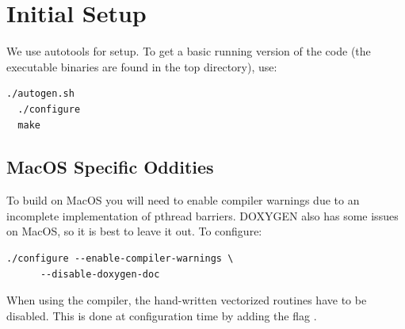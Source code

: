 \section{Initial Setup}

We use autotools for setup. To get a basic running version of the code (the
executable binaries are found in the top directory), use:

\begin{lstlisting}[style=codeblock]
  ./autogen.sh
  ./configure
  make
\end{lstlisting}


\subsection{MacOS Specific Oddities}

To build on MacOS you will need to enable compiler warnings due to an
incomplete implementation of pthread barriers. DOXYGEN also has some issues on
MacOS, so it is best to leave it out. To configure:

\begin{lstlisting}[style=codeblock]
  ./configure --enable-compiler-warnings \
      --disable-doxygen-doc
\end{lstlisting}

When using the  compiler, the hand-written vectorized
routines have to be disabled. This is done at configuration time by adding the
flag \inlinecode{-{}-disable-hand-vec}.


